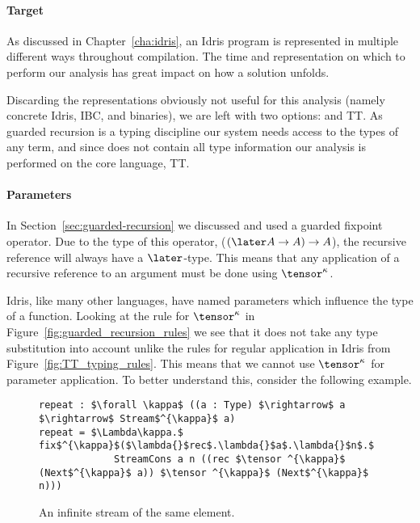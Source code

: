 \paragraph{Target}
As discussed in Chapter~\ref{cha:idris}, an Idris program is represented in
multiple different ways throughout compilation. The time and representation on
which to perform our analysis has great impact on how a solution
unfolds.

Discarding the representations obviously not useful for this analysis (namely
concrete Idris, IBC, and binaries), we are left with two options: \IdrisM and
TT. As guarded recursion is a typing discipline our system needs access to
the types of any term, and since \IdrisM does not contain all type information
our analysis is performed on the core language, TT.

\paragraph{Parameters}
In Section~\ref{sec:guarded-recursion} we discussed and used a guarded fixpoint
operator. Due to the type of this operator, ($(\later A \rightarrow A)
\rightarrow A$), the recursive reference will always have a $\later$-type. This
means that any application of a recursive reference to an argument must be done
using $\tensor ^{\kappa}$.

Idris, like many other languages, have named parameters which influence the type
of a function. Looking at the rule for $\tensor ^{\kappa}$ in
Figure~\ref{fig:guarded_recursion_rules} we see that it does not take any type
substitution into account unlike the rules for regular application in Idris from
Figure~\ref{fig:TT_typing_rules}. This means that we cannot use $\tensor ^{\kappa}$ for
parameter application. To better understand this, consider the following example.

\begin{figure}[h]
  \begin{lstlisting}[mathescape]
repeat : $\forall \kappa$ ((a : Type) $\rightarrow$ a $\rightarrow$ Stream$^{\kappa}$ a)
repeat = $\Lambda\kappa.$ fix$^{\kappa}$($\lambda{}$rec$.\lambda{}$a$.\lambda{}$n$.$ 
             StreamCons a n ((rec $\tensor ^{\kappa}$ (Next$^{\kappa}$ a)) $\tensor ^{\kappa}$ (Next$^{\kappa}$ n)))
\end{lstlisting}
  \caption{An infinite stream of the same element.}
  \label{fig:repeat_guarded_example}
\end{figure}

